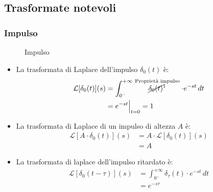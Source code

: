 \documentclass[a4paper]{article}
\begin{document}
\subsection{Trasformate notevoli}
\subsubsection{Impulso}
\begin{figure}[H]
  \centering
  \caption{Impulso}
\end{figure}
\begin{itemize}
  \item 
    La trasformata di Laplace dell'impulso \( \delta_0(t) \) è:
    \[
      \begin{aligned}
        \mathcal{L}[\delta_0(t)](s) &= \int_{0^-}^{+\infty} \stackrel{\text{Proprietà impulso}}{\cancel{\delta_0(t)}^1} \cdot e^{-st} \, dt\\
                                    &= e^{-st} \Big|_{t=0} = 1
      \end{aligned}
    \] 

  \item 
    La trasformata di Laplace di un impulso di altezza \( A \) è:
    \[
      \begin{aligned}
        \mathcal{L}[A \cdot \delta_0(t)](s) &= A \cdot \mathcal{L}[\delta_0(t)](s)\\
                                            &= A
      \end{aligned}
    \] 
  \item 
    La trasformata di laplace dell'impulso ritardato è:
    \[
      \begin{aligned}
        \mathcal{L}[\delta_0(t - \tau)](s) &= \int_{0^-}^{+\infty} \delta_{\tau}(t) \cdot e^{-st} \, dt\\
                                             &= e^{-s \tau}
      \end{aligned}
    \] 
\end{itemize}
\end{document}

